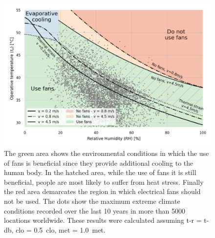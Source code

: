 \begin{figure}[thb!]
    \centering
    \includegraphics[width=\textwidth]{figures/use_fans.png}
    \caption{The green area shows the environmental conditions in which the use of fans is beneficial since they provide additional cooling to the human body.
    In the hatched area, while the use of fans it is still beneficial, people are most likely to suffer from heat stress.
    Finally the red area demarcates the region in which electrical fans should not be used.
    The dots show the maximum extreme climate conditions recorded over the last 10 years in more than 5000 locations worldwide.
     These results were calculated assuming \ac{t-r} = \ac{t-db}, \ac{clo} = 0.5~clo, \ac{met} = 1.0~met.}
    \label{fig:energy_storage_delta}
\end{figure}


